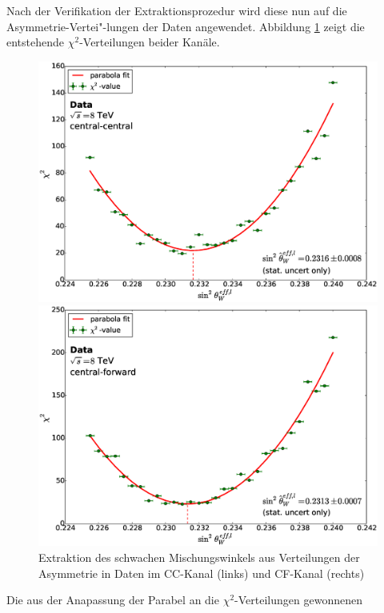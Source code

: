 Nach der Verifikation der Extraktionsprozedur wird diese nun auf die
Asymmetrie-Vertei"-lungen der Daten angewendet. Abbildung \ref{fig:sin2theta}
zeigt die entstehende $\chi^2$-Verteilungen beider Kanäle.
\begin{figure}[p]
    \centering
    \includegraphics[width=1.0\textwidth]{plots/sin2theta_cc_data}

    \includegraphics[width=1.0\textwidth]{plots/sin2theta_cf_data}
    \caption[Extraktion des schwachen Mischungswinkels aus Verteilungen der
        Asymmetrie in Daten]
        {Extraktion des schwachen Mischungswinkels aus Verteilungen der
        Asymmetrie in Daten im \ac{CC}-Kanal (links) und \ac{CF}-Kanal
        (rechts)}
    \label{fig:sin2theta}
\end{figure}
Die aus der Anapassung der Parabel an die $\chi^2$-Verteilungen gewonnenen

